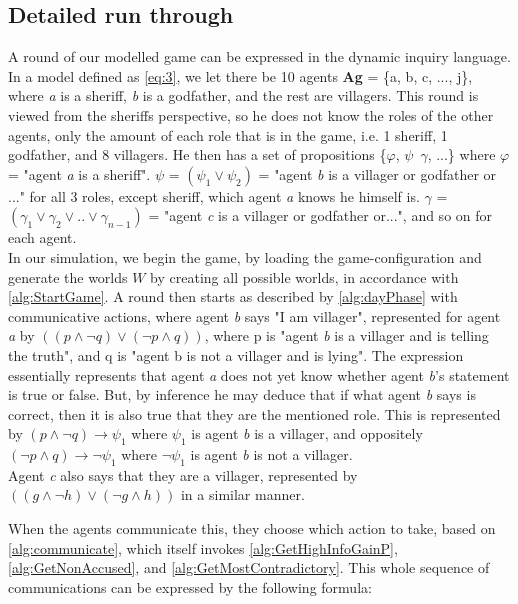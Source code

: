 \subsection{Detailed run through}\label{sec:ARoundOfTheGame}
A round of our modelled game can be expressed in the dynamic inquiry language.
In a model defined as \cref{eq:3}, we let there be 10 agents \textbf{Ag} = \{a,
b, c, ..., j\}, where \textit{a} is a sheriff, \textit{b} is a godfather, and
the rest are villagers. This round is viewed from the sheriffs perspective, so
he does not know the roles of the other agents, only the amount of each role
that is in the game, i.e. 1 sheriff, 1 godfather, and 8 villagers. He then has
a set of propositions \{$\varphi$, $\psi$\, $\gamma$, ...\} where $\varphi$ =
"agent \textit{a} is a sheriff". $\psi$ = $(\psi_1 \lor \psi_2)$ = "agent
\textit{b} is a villager or godfather or ..." for all 3 roles, except sheriff,
which agent \textit{a} knows he himself is. $\gamma$ = $(\gamma_1 \lor \gamma_2
	\lor .. \lor \gamma_{n-1}) $ = "agent \textit{c} is a villager or godfather
or...", and so on for each agent. \\ In our simulation, we begin the game, by
loading the game-configuration and generate the worlds $W$ by creating all
possible worlds, in accordance with \cref{alg:StartGame}. A round then starts
as described by \cref{alg:dayPhase} with communicative actions, where agent
\textit{b} says "I am villager", represented for agent \textit{a} by $((p \land
	\neg q) \lor (\neg p \land q))$, where p is "agent \textit{b} is a villager and
is telling the truth", and q is "agent b is not a villager and is lying". The
expression essentially represents that agent \textit{a} does not yet know
whether agent \textit{b}'s statement is true or false. But, by inference he may
deduce that if what agent \textit{b} says is correct, then it is also true that
they are the mentioned role. This is represented by $(p \land \neg q)
	\rightarrow \psi_1$ where $\psi_1$ is agent \textit{b} is a villager, and
oppositely $(\neg p \land q) \rightarrow \neg \psi_1$ where $\neg \psi_1$ is
agent \textit{b} is not a villager. \\ Agent \textit{c} also says that they are
a villager, represented by $((g \land \neg h) \lor (\neg g \land h))$ in a
similar manner.

When the agents communicate this, they choose which action to take, based on
\cref{alg:communicate}, which itself invokes \cref{alg:GetHighInfoGainP},
\cref{alg:GetNonAccused}, and \cref{alg:GetMostContradictory}. This whole
sequence of communications can be expressed by the following formula:

